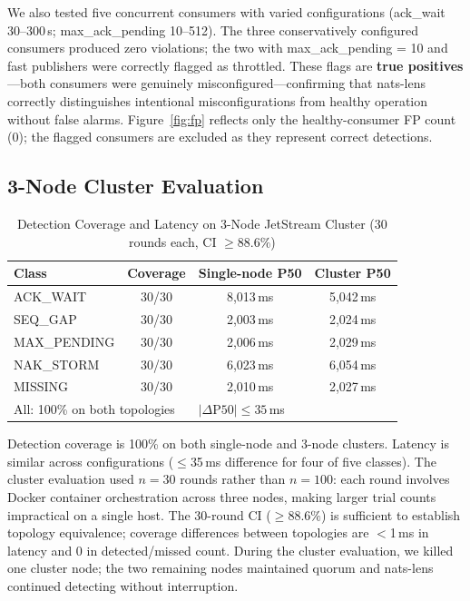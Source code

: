 \documentclass[sigconf,nonacm]{acmart}
\begin{document}
We also tested five concurrent consumers with varied configurations (ack\_wait
30--300\,s; max\_ack\_pending 10--512). The three conservatively configured
consumers produced zero violations; the two with max\_ack\_pending = 10
and fast publishers were correctly flagged as throttled.
These flags are \textbf{true positives}---both consumers were genuinely
misconfigured---confirming that nats-lens correctly distinguishes
intentional misconfigurations from healthy operation without false alarms.
Figure~\ref{fig:fp} reflects only the healthy-consumer FP count (0);
the flagged consumers are excluded as they represent correct detections.

\subsection{3-Node Cluster Evaluation}

\begin{table}[h]
\centering
\caption{Detection Coverage and Latency on 3-Node JetStream Cluster (30 rounds each, CI $\geq 88.6\%$)}
\label{tab:cluster}
\small\begin{tabular}{lccc}
\toprule
Class & Coverage & Single-node P50 & Cluster P50 \\
\midrule
ACK\_WAIT    & 30/30 & 8,013\,ms & 5,042\,ms \\
SEQ\_GAP     & 30/30 & 2,003\,ms & 2,024\,ms \\
MAX\_PENDING & 30/30 & 2,006\,ms & 2,029\,ms \\
NAK\_STORM   & 30/30 & 6,023\,ms & 6,054\,ms \\
MISSING      & 30/30 & 2,010\,ms & 2,027\,ms \\
\midrule
\multicolumn{2}{l}{\small All: 100\% on both topologies} & \multicolumn{2}{l}{\small $|\Delta\text{P50}| \leq 35$\,ms} \\
\bottomrule
\end{tabular}
\end{table}

Detection coverage is 100\% on both single-node and 3-node clusters.
Latency is similar across configurations ($\leq$35\,ms difference for
four of five classes).
The cluster evaluation used $n{=}30$ rounds rather than $n{=}100$:
each round involves Docker container orchestration across three nodes,
making larger trial counts impractical on a single host.
The 30-round CI ($\geq 88.6\%$) is sufficient to establish topology
equivalence; coverage differences between topologies are $<$1\,ms in
latency and 0 in detected/missed count.
During the cluster evaluation, we killed one cluster node; the two
remaining nodes maintained quorum and nats-lens continued detecting
without interruption.
\end{document}

